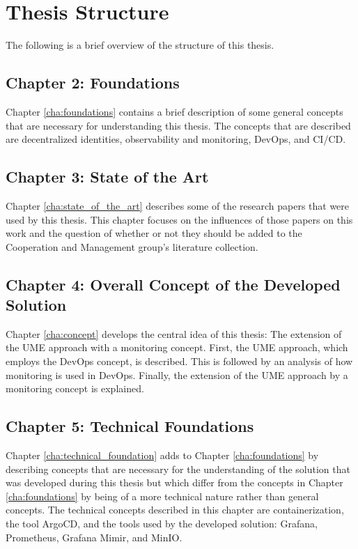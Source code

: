 
\section{Thesis Structure}
\label{sec:thesis_structure}

The following is a brief overview of the structure of this thesis.

\subsection*{Chapter 2: Foundations}

Chapter \ref{cha:foundations} contains a brief description of some general concepts
that are necessary for understanding this thesis. The concepts that are described
are decentralized identities, observability and monitoring, DevOps, and CI/CD.

\subsection*{Chapter 3: State of the Art}

Chapter \ref{cha:state_of_the_art} describes some of the research papers that were
used by this thesis. This chapter focuses on the influences of those papers on this
work and the question of whether or not they should be added to the Cooperation and Management
group's literature collection.

\subsection*{Chapter 4: Overall Concept of the Developed Solution}

Chapter \ref{cha:concept} develops the central idea of this thesis: The extension
of the UME approach with a monitoring concept. First, the UME approach,
which employs the DevOps concept, is described. This is followed by an analysis
of how monitoring is used in DevOps. Finally, the extension of the UME approach
by a monitoring concept is explained.

\subsection*{Chapter 5: Technical Foundations}

Chapter \ref{cha:technical_foundation} adds to Chapter \ref{cha:foundations}
by describing concepts that are necessary for the understanding of the solution
that was developed during this thesis but which differ from the concepts in Chapter \ref{cha:foundations}
by being of a more technical nature rather than general concepts.
The technical concepts described in this chapter are containerization, the tool ArgoCD,
and the tools used by the developed solution: Grafana, Prometheus, Grafana Mimir, and MinIO.

